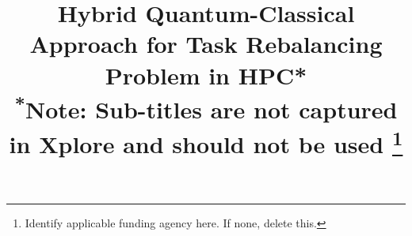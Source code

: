 \documentclass[conference]{IEEEtran}
\begin{document}
\title{Hybrid Quantum-Classical Approach for Task Rebalancing Problem in HPC*\\
{\footnotesize \textsuperscript{*}Note: Sub-titles are not captured in Xplore and
should not be used}
\thanks{Identify applicable funding agency here. If none, delete this.}
}


\author{
}
\end{document}
